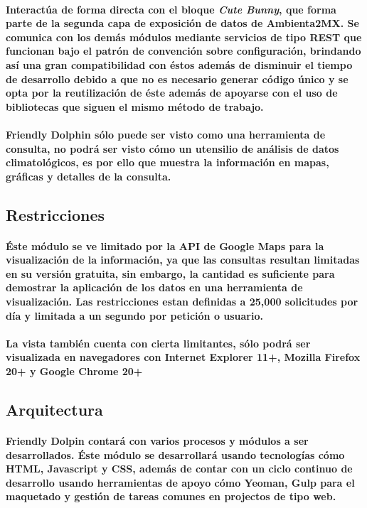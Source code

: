     \paragraph{Interactúa de forma directa con el bloque \textbf{\emph{Cute Bunny}}, que forma parte de la segunda capa de exposición de datos de Ambienta2MX. Se comunica con los demás módulos mediante servicios de tipo REST que funcionan bajo el patrón de convención sobre configuración\cite{8}, brindando así una gran compatibilidad con éstos además de disminuir el tiempo de desarrollo debido a que no es necesario generar código único y se opta por la reutilización de éste además de apoyarse con el uso de bibliotecas que siguen el mismo método de trabajo.}
    \paragraph{Friendly Dolphin sólo puede ser visto como una herramienta de consulta, no podrá ser visto cómo un utensilio de análisis de datos climatológicos, es por ello que muestra la información en mapas, gráficas y detalles de la consulta.}
  \subsection{Restricciones}
    \paragraph{Éste módulo se ve limitado por la API de Google Maps para la visualización de la información, ya que las consultas resultan limitadas en su versión gratuita, sin embargo, la cantidad es suficiente para demostrar la aplicación de los datos en una herramienta de visualización. Las restricciones estan definidas a 25,000 solicitudes por día y limitada a un segundo por petición o usuario.}
    \paragraph{La vista también cuenta con cierta limitantes, sólo podrá ser visualizada en navegadores con Internet Explorer 11+, Mozilla Firefox 20+ y Google Chrome 20+}
  \subsection{Arquitectura}
    \paragraph{Friendly Dolpin contará con varios procesos y módulos a ser desarrollados. Éste módulo se desarrollará usando tecnologías cómo HTML, Javascript y CSS, además de contar con un ciclo continuo de desarrollo usando herramientas de apoyo cómo Yeoman, Gulp para el maquetado y gestión de tareas comunes en projectos de tipo web.}
